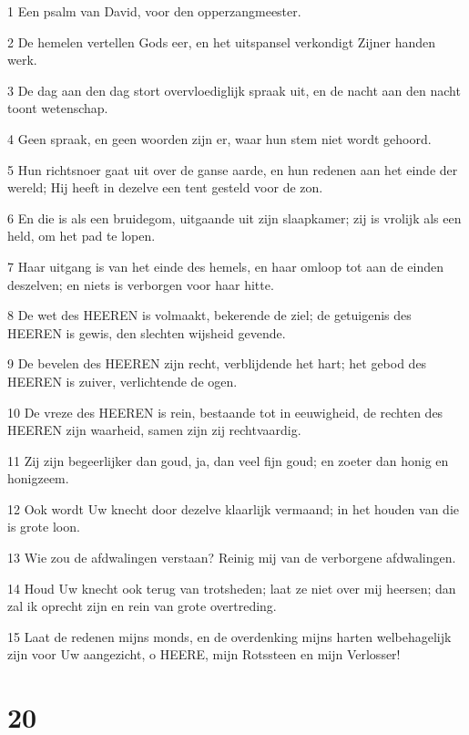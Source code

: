 \par 1 Een psalm van David, voor den opperzangmeester.
\par 2 De hemelen vertellen Gods eer, en het uitspansel verkondigt Zijner handen werk.
\par 3 De dag aan den dag stort overvloediglijk spraak uit, en de nacht aan den nacht toont wetenschap.
\par 4 Geen spraak, en geen woorden zijn er, waar hun stem niet wordt gehoord.
\par 5 Hun richtsnoer gaat uit over de ganse aarde, en hun redenen aan het einde der wereld; Hij heeft in dezelve een tent gesteld voor de zon.
\par 6 En die is als een bruidegom, uitgaande uit zijn slaapkamer; zij is vrolijk als een held, om het pad te lopen.
\par 7 Haar uitgang is van het einde des hemels, en haar omloop tot aan de einden deszelven; en niets is verborgen voor haar hitte.
\par 8 De wet des HEEREN is volmaakt, bekerende de ziel; de getuigenis des HEEREN is gewis, den slechten wijsheid gevende.
\par 9 De bevelen des HEEREN zijn recht, verblijdende het hart; het gebod des HEEREN is zuiver, verlichtende de ogen.
\par 10 De vreze des HEEREN is rein, bestaande tot in eeuwigheid, de rechten des HEEREN zijn waarheid, samen zijn zij rechtvaardig.
\par 11 Zij zijn begeerlijker dan goud, ja, dan veel fijn goud; en zoeter dan honig en honigzeem.
\par 12 Ook wordt Uw knecht door dezelve klaarlijk vermaand; in het houden van die is grote loon.
\par 13 Wie zou de afdwalingen verstaan? Reinig mij van de verborgene afdwalingen.
\par 14 Houd Uw knecht ook terug van trotsheden; laat ze niet over mij heersen; dan zal ik oprecht zijn en rein van grote overtreding.
\par 15 Laat de redenen mijns monds, en de overdenking mijns harten welbehagelijk zijn voor Uw aangezicht, o HEERE, mijn Rotssteen en mijn Verlosser!

\chapter{20}

